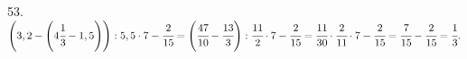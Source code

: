 53. $\left(3,2-\left(4\cfrac{1}{3}-1,5\right)\right):5,5\cdot7-\cfrac{2}{15}=
\left(\cfrac{47}{10}-\cfrac{13}{3}\right):\cfrac{11}{2}\cdot7-\cfrac{2}{15}=
\cfrac{11}{30}\cdot\cfrac{2}{11}\cdot7-\cfrac{2}{15}=
\cfrac{7}{15}-\cfrac{2}{15}=\cfrac{1}{3}.$\\
